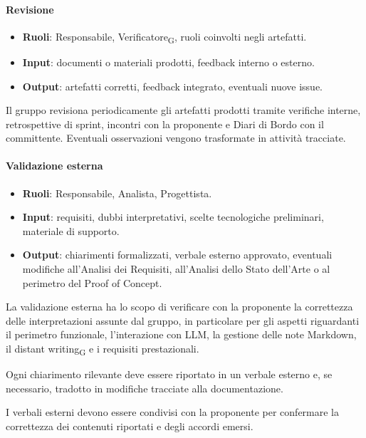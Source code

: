 \paragraph{Revisione}

\begin{itemize}
    \item \textbf{Ruoli}: Responsabile, Verificatore\textsubscript{G}, ruoli coinvolti negli artefatti.
    \item \textbf{Input}: documenti o materiali prodotti, feedback interno o esterno.
    \item \textbf{Output}: artefatti corretti, feedback integrato, eventuali nuove issue.
\end{itemize}

Il gruppo revisiona periodicamente gli artefatti prodotti tramite verifiche interne,
retrospettive di sprint, incontri con la proponente e Diari di Bordo con il committente.
Eventuali osservazioni vengono trasformate in attività tracciate.

\paragraph{Validazione esterna}

\begin{itemize}
    \item \textbf{Ruoli}: Responsabile, Analista, Progettista.
    \item \textbf{Input}: requisiti, dubbi interpretativi, scelte tecnologiche preliminari,
    materiale di supporto.
    \item \textbf{Output}: chiarimenti formalizzati, verbale esterno approvato,
      eventuali modifiche all'Analisi dei Requisiti, all'Analisi dello Stato dell'Arte
      o al perimetro del Proof of Concept.
\end{itemize}

La validazione esterna ha lo scopo di verificare con la proponente la correttezza
delle interpretazioni assunte dal gruppo, in particolare per gli aspetti riguardanti
il perimetro funzionale, l'interazione con LLM, la gestione delle note Markdown,
il distant writing\textsubscript{G} e i requisiti prestazionali.

Ogni chiarimento rilevante deve essere riportato in un verbale esterno e, se
necessario, tradotto in modifiche tracciate alla documentazione.

I verbali esterni devono essere condivisi con la proponente per confermare la
correttezza dei contenuti riportati e degli accordi emersi.

